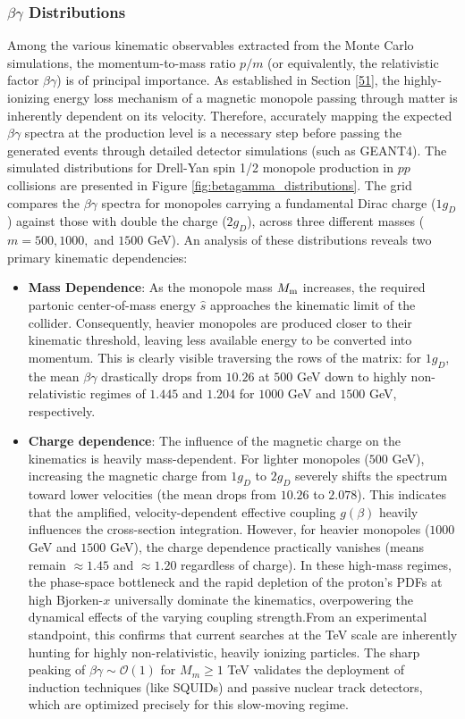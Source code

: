 \documentclass[a4paper,11pt]{article}
\begin{document}
 \subsubsection{\texorpdfstring{$\beta\gamma$}{beta-gamma} Distributions}

 Among the various kinematic observables extracted from the Monte Carlo simulations, the momentum-to-mass ratio $p/m$ (or equivalently, the relativistic factor $\beta\gamma$) is of principal importance. As established in Section \ref{51}, the highly-ionizing energy loss mechanism of a magnetic monopole passing through matter is inherently dependent on its velocity. Therefore, accurately mapping the expected $\beta\gamma$ spectra at the production level is a necessary step before passing the generated events through detailed detector simulations (such as GEANT4). The simulated distributions for Drell-Yan spin 1/2 monopole production in $pp$ collisions are presented in Figure \ref{fig:betagamma_distributions}. The grid compares the $\beta\gamma$ spectra for monopoles carrying a fundamental Dirac charge ($1g_D$) against those with double the charge ($2g_D$), across three different masses ($m = 500, 1000,$ and $1500$ GeV). An analysis of these distributions reveals two primary kinematic dependencies:

\begin{itemize}
    \item \textbf{Mass Dependence}: As the monopole mass $M_{\text m}$ increases, the required partonic center-of-mass energy $\hat{s}$ approaches the kinematic limit of the collider. Consequently, heavier monopoles are produced closer to their kinematic threshold, leaving less available energy to be converted into momentum. This is clearly visible traversing the rows of the matrix: for $1g_D$, the mean $\beta\gamma$ drastically drops from $10.26$ at $500$ GeV down to highly non-relativistic regimes of $1.445$ and $1.204$ for $1000$ GeV and $1500$ GeV, respectively.
    \item \textbf{Charge dependence}:  The influence of the magnetic charge on the kinematics is heavily mass-dependent. For lighter monopoles ($500$ GeV), increasing the magnetic charge from $1g_D$ to $2g_D$ severely shifts the spectrum toward lower velocities (the mean drops from $10.26$ to $2.078$). This indicates that the amplified, velocity-dependent effective coupling $g(\beta)$ heavily influences the cross-section integration. However, for heavier monopoles ($1000$ GeV and $1500$ GeV), the charge dependence practically vanishes (means remain $\approx 1.45$ and $\approx 1.20$ regardless of charge). In these high-mass regimes, the phase-space bottleneck and the rapid depletion of the proton's PDFs at high Bjorken-$x$ universally dominate the kinematics, overpowering the dynamical effects of the varying coupling strength.From an experimental standpoint, this confirms that current searches at the TeV scale are inherently hunting for highly non-relativistic, heavily ionizing particles. The sharp peaking of $\beta\gamma \sim \mathcal{O}(1)$ for $M_m \ge 1$ TeV validates the deployment of induction techniques (like SQUIDs) and passive nuclear track detectors, which are optimized precisely for this slow-moving regime.
\end{itemize}
\end{document}
